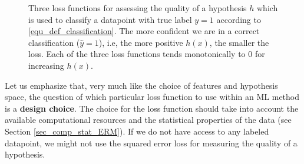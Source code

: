 \documentclass[12pt]{report}
\begin{document}
\hspace*{10mm}
\begin{center}
\begin{figure}[htbp]
     \vspace*{-10mm}
\caption{Three loss functions for assessing the quality of a hypothesis $h$ 
	which is used to classify a datapoint with true label $y=1$ according to \eqref{equ_def_classification}. 
	The more confident we are in a correct classification ($\hat{y}=1$), i.e, 
	the more positive $h(x)$, the smaller the loss. Each of the three loss 
	functions tends monotonically to $0$ for increasing $h(x)$.}
\label{fig_class_loss}
\end{figure}
\end{center}

Let us emphasize that, very much like the choice of features 
and hypothesis space, the question of which particular loss 
function to use within an ML method is a {\bf design choice}. 
The choice for the loss function should take into account the 
available computational resources and the statistical properties 
of the data (see Section \ref{sec_comp_stat_ERM}). If we do 
not have access to any labeled datapoint, we might not use 
the squared error loss for measuring the quality of a hypothesis. 
\end{document}
